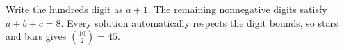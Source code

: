 Write the hundreds digit as $a+1$. The remaining nonnegative digits satisfy $a+b+c=8$. Every solution automatically respects the digit bounds, so stars and bars gives $\binom{10}{2}=\boxed{45}$.
